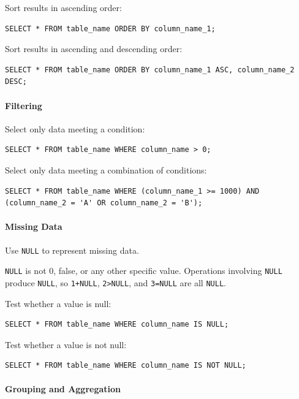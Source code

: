\documentclass[]{book}
\begin{document}
Sort results in ascending order:

\begin{verbatim}
SELECT * FROM table_name ORDER BY column_name_1;
\end{verbatim}

Sort results in ascending and descending order:

\begin{verbatim}
SELECT * FROM table_name ORDER BY column_name_1 ASC, column_name_2 DESC;
\end{verbatim}

\mbox{}\paragraph{Filtering}

Select only data meeting a condition:

\begin{verbatim}
SELECT * FROM table_name WHERE column_name > 0;
\end{verbatim}

Select only data meeting a combination of conditions:

\begin{verbatim}
SELECT * FROM table_name WHERE (column_name_1 >= 1000) AND (column_name_2 = 'A' OR column_name_2 = 'B');
\end{verbatim}

\mbox{}\paragraph{Missing Data}

Use \texttt{NULL} to represent missing data.

\texttt{NULL} is not 0, false, or any other specific value. Operations
involving \texttt{NULL} produce \texttt{NULL}, so \texttt{1+NULL},
\texttt{2\textgreater{}NULL}, and \texttt{3=NULL} are all \texttt{NULL}.

Test whether a value is null:

\begin{verbatim}
SELECT * FROM table_name WHERE column_name IS NULL;
\end{verbatim}

Test whether a value is not null:

\begin{verbatim}
SELECT * FROM table_name WHERE column_name IS NOT NULL;
\end{verbatim}

\mbox{}\paragraph{Grouping and Aggregation}
\end{document}

